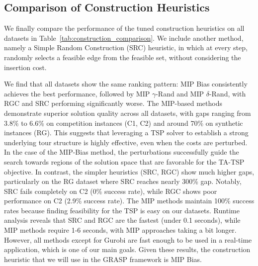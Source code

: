 \subsection{Comparison of Construction Heuristics}

We finally compare the performance of the tuned construction heuristics on all datasets in Table~\ref{tab:construction_comparison}.
We include another method, namely a Simple Random Construction (SRC) heuristic, in which at every step, randomly selects a feasible edge from the feasible set, without considering the insertion cost.

We find that all datasets show the same ranking pattern: MIP Bias consistently achieves the best performance, followed by MIP $\gamma$-Rand and MIP $\delta$-Rand, with RGC and SRC performing significantly worse.
The MIP-based methods demonstrate superior solution quality across all datasets, with gaps ranging from 3.8\% to 6.6\% on competition instances (C1, C2) and around 70\% on synthetic instances (RG). This suggests that leveraging a TSP solver to establish a strong underlying tour structure is highly effective, even when the costs are perturbed.
In the case of the MIP-Bias method, the perturbations successfully guide the search towards regions of the solution space that are favorable for the TA-TSP objective.
In contrast, the simpler heuristics (SRC, RGC) show much higher gaps, particularly on the RG dataset where SRC reaches nearly 300\% gap. Notably, SRC fails completely on C2 (0\% success rate), while RGC shows poor performance on C2 (2.9\% success rate).
The MIP methods maintain 100\% success rates because finding feasibility for the TSP is easy on our datasets. Runtime analysis reveals that SRC and RGC are the fastest (under 0.1 seconds), while MIP methods require 1-6 seconds, with MIP approaches taking a bit longer.
However, all methods except for Gurobi are fast enough to be used in a real-time application, which is one of our main goals.
Given these results, the construction heuristic that we will use in the GRASP framework is MIP Bias.


